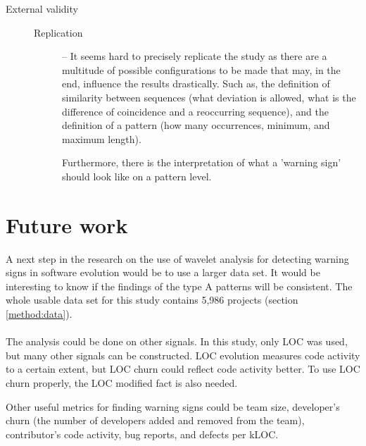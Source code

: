 \begin{description}
	\item[External validity] \hfill

	\begin{description}
		\item[\rm{Replication}] -- It seems hard to precisely replicate the study
			as there are a multitude of possible configurations to be made that may, in
			the end, influence the results drastically. Such as, the definition of
			similarity between sequences (what deviation is allowed, what is the
			difference of coincidence and a reoccurring sequence), and the definition of
			a pattern (how many occurrences, minimum, and maximum length).
			
			Furthermore, there is the interpretation of what a 'warning sign' should
			look like on a pattern level.
	\end{description}
\end{description}

\section{Future work}
A next step in the research on the use of wavelet analysis for detecting
warning signs in software evolution would be to use a larger data set. It would
be interesting to know if the findings of the type A patterns will be
consistent. The whole usable data set for this study contains 5,986 projects
(section \ref{method:data}).

\paragraph{}
The analysis could be done on other signals. In this study, only LOC was used,
but many other signals can be constructed. LOC evolution measures code activity
to a certain extent, but LOC churn could reflect code activity better. To use
LOC churn properly, the LOC modified fact is also needed.

Other useful metrics for finding warning signs could be team size, developer's
churn (the number of developers added and removed from the team), contributor's
code activity, bug reports, and defects per kLOC.

